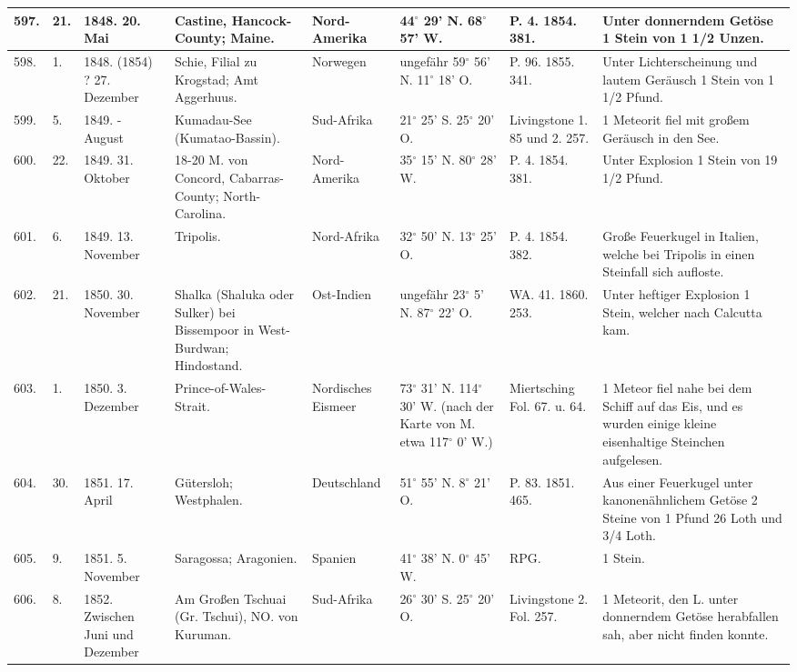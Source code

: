 \documentclass[a4paper, 11pt, oneside, polutonikogreek, german]{article}
\begin{document}
\begin{table}[!ht]
\begin{tabular}{|l|l|l|l|l|l|l|l|}
        597. & 21. & 1848. 20. Mai & Castine, Hancock-County; Maine. & Nord-Amerika & 44$^\circ$ 29' N. 68$^\circ$ 57' W. & P. 4. 1854. 381. & Unter donnerndem Getöse 1 Stein von 1 1/2 Unzen. \\ \hline
        598. & 1. & 1848. (1854) ? 27. Dezember & Schie, Filial zu Krogstad; Amt Aggerhuus. & Norwegen & ungefähr 59$^\circ$ 56' N. 11$^\circ$ 18' O. & P. 96. 1855. 341. & Unter Lichterscheinung und lautem Geräusch 1 Stein von 1 1/2 Pfund. \\ \hline
        599. & 5. & 1849. - August & Kumadau-See (Kumatao-Bassin). & Sud-Afrika & 21$^\circ$ 25' S. 25$^\circ$ 20' O. & Livingstone 1. 85 und 2. 257. & 1 Meteorit fiel mit großem Geräusch in den See. \\ \hline
        600. & 22. & 1849. 31. Oktober & 18-20 M. von Concord, Cabarras-County; North-Carolina. & Nord-Amerika & 35$^\circ$ 15' N. 80$^\circ$ 28' W. & P. 4. 1854. 381. & Unter Explosion 1 Stein von 19 1/2 Pfund. \\ \hline
        601. & 6. & 1849. 13. November & Tripolis. & Nord-Afrika & 32$^\circ$ 50' N. 13$^\circ$ 25' O. & P. 4. 1854. 382. & Große Feuerkugel in Italien, welche bei Tripolis in einen Steinfall sich aufloste. \\ \hline
        602. & 21. & 1850. 30. November & Shalka (Shaluka oder Sulker) bei Bissempoor in West-Burdwan; Hindostand. & Ost-Indien & ungefähr 23$^\circ$ 5' N. 87$^\circ$ 22' O. & WA. 41. 1860. 253. & Unter heftiger Explosion 1 Stein, welcher nach Calcutta kam. \\ \hline
        603. & 1. & 1850. 3. Dezember & Prince-of-Wales-Strait. & Nordisches Eismeer & 73$^\circ$ 31' N. 114$^\circ$ 30' W. (nach der Karte von M. etwa 117$^\circ$ 0' W.) & Miertsching Fol. 67. u. 64. & 1 Meteor fiel nahe bei dem Schiff auf das Eis, und es wurden einige kleine eisenhaltige Steinchen aufgelesen. \\ \hline
        604. & 30. & 1851. 17. April & Gütersloh; Westphalen. & Deutschland & 51$^\circ$ 55' N. 8$^\circ$ 21' O. & P. 83. 1851. 465. & Aus einer Feuerkugel unter kanonenähnlichem Getöse 2 Steine von 1 Pfund 26 Loth und 3/4 Loth. \\ \hline
        605. & 9. & 1851. 5. November & Saragossa; Aragonien. & Spanien & 41$^\circ$ 38' N. 0$^\circ$ 45' W. & RPG. & 1 Stein. \\ \hline
        606. & 8. & 1852. Zwischen Juni und Dezember & Am Großen Tschuai (Gr. Tschui), NO. von Kuruman. & Sud-Afrika & 26$^\circ$ 30' S. 25$^\circ$ 20' O. & Livingstone 2. Fol. 257. & 1 Meteorit, den L. unter donnerndem Getöse herabfallen sah, aber nicht finden konnte. \\ \hline

\end{tabular}
\end{table}
\end{document}
